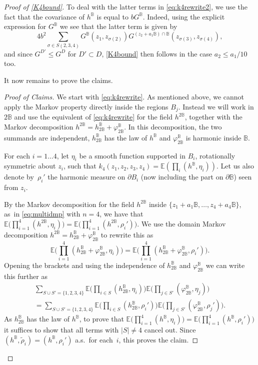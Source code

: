 \documentclass[JEP,XML,SOM,Unicode,published]{cedram}
\let\ts\textstyle
\theoremstyle{definition}
\newcommand{\E}{\mathbb{E}}
\newcommand{\B}{\mathbb{B}}\let\D\B\let\Ub\B
\begin{document}
\begin{proof}[Proof of \eqref{K4bound}]
To deal with the latter terms in \eqref{eq:k4rewrite2}, we use the fact that the covariance of $h^\B$ is equal to $bG^\B$. Indeed, using the explicit expression for $G^\B$ we see that the latter term is given
by\vspace*{-3pt}
\[
4b^2\sum_{\sigma\in S({2,3,4})}G^\B(z_1,z_{\sigma(2)})G^{(z_2+a_1\B)\cap \B}(z_{\sigma(3)},z_{\sigma(4)}),
\]
and since $G^{D'}\le G^D$ for $D'\subset D$, \eqref{K4bound} then follows in the case $a_2 \leq a_1/10$ too. \medskip

{It now remains to prove the claims.}

\begin{proof}[Proof of Claims]
We start with \eqref{eq:k4rewrite}. As mentioned above, we cannot apply the Markov property directly inside the regions $B_j$. Instead we will work in $2\B$ and use the equivalent of \eqref{eq:k4rewrite} for the field $h^{2\B}$, together with the Markov decomposition $h^{2\B}=h^\B_{2\B}+\varphi^\B_{2\B}$. In this decomposition, the two summands are independent, $h^{\B}_{2\B}$ has the law of $h^\B$ and $\varphi_{2\B}^\B$ is harmonic inside $\B$.

For each $i = 1 \dots 4$, let $\eta_i$ be a smooth function supported in $B_i$, rotationally symmetric about $z_i$, such that $k_4(z_1,z_2,z_3,z_4)=\E(\prod_i (h^\B,\eta_i))$. Let us also denote by~$\rho_i'$ the harmonic measure on $\partial B_i$ (now including the part on $\partial \B$) seen from $z_i$.

By the Markov decomposition for the field $h^{2\B}$ inside $\{z_1+a_1\B,\dots, z_4+a_4\B\}$, as~in \eqref{eq:multidmp} with $n=4$, we have that {$\E\bigl(\prod_{i=1}^4 (h^{2\B},\eta_i)\bigr) = \E\bigl(\prod_{i=1}^4 (h^{2\B},\rho_i')\bigr)$.} We use the domain Markov decomposition $h^{2\B}=h^\B_{2\B}+\varphi^\B_{2\B}$ to rewrite this as
\[\ts
\E\bigl(\prod_{i=1}^4 (h^\B_{2\B}+\varphi^\B_{2\B},\eta_i)\bigr) = \E\bigl(\prod_{i=1}^4 (h^\B_{2\B}+\varphi^\B_{2\B},\rho_i') \bigr).
\]
Opening the brackets and using the independence of $h^\B_{2\B}$ and $\varphi^\B_{2\B}$ we can write this further as
\begin{multline*}
\sum_{S \cup S' = \{1,2,3,4\}} \ts\E\bigl(\prod_{i\in S} (h^\B_{2\B},\eta_i)\bigr)\E\bigl(\prod_{j\in S'} (\varphi^\B_{2\B},\eta_j)\bigr)\\
= \sum_{S \cup S' = \{1,2,3,4\}} \ts\E\bigl(\prod_{i\in S} (h^\B_{2\B},\rho_i')\bigr)\E\bigl(\prod_{j\in S'} (\varphi^\B_{2\B},\rho_j')\bigr).
\end{multline*}
As $h^{\B}_{2\B}$ has the law of $h^\B$, to prove that $\E\bigl(\prod_{i=1}^4 (h^{\B},\eta_i)\bigr) = \E\bigl(\prod_{i=1}^4 (h^{\B},\rho_i')\bigr)$ it suffices to show that all terms with $|S| \neq 4$ cancel out. Since $(h^\B,\tilde{\rho}_i)=(h^\B,\rho_i')$ a.s.\ for each~$i$, this proves the claim.


\end{proof}
\end{proof}
\end{document}
